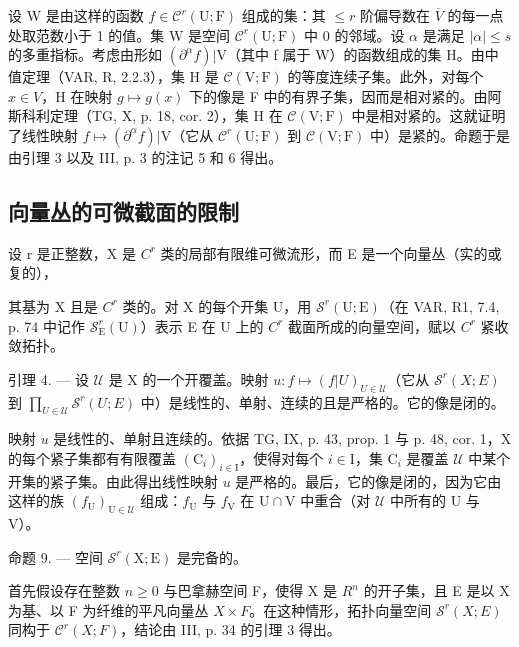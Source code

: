设 W 是由这样的函数 \(f \in \mathcal{C}^{r}(\mathrm{U};\mathrm{F})\) 组成的集：其 \(\leqslant r\) 阶偏导数在 \(\overline{V}\) 的每一点处取范数小于 1 的值。集 W 是空间 \(\mathcal{C}^{r}(\mathrm{U};\mathrm{F})\) 中 0 的邻域。设 \(\alpha\) 是满足 \(|\alpha| \leqslant s\) 的多重指标。考虑由形如 \((\partial^{\alpha}f)|\mathrm{V}\)（其中 f 属于 W）的函数组成的集 H。由中值定理（VAR, R, 2.2.3），集 H 是 \(\mathcal{C}(\mathrm{V};\mathrm{F})\) 的等度连续子集。此外，对每个 \(x \in V\)，H 在映射 \(g \mapsto g(x)\) 下的像是 F 中的有界子集，因而是相对紧的。由阿斯科利定理（TG, X, p. 18, cor. 2），集 H 在 \(\mathcal{C}(\mathrm{V};\mathrm{F})\) 中是相对紧的。这就证明了线性映射 \(f \mapsto (\partial^{\alpha}f)|\mathrm{V}\)（它从 \(\mathcal{C}^{r}(\mathrm{U};\mathrm{F})\) 到 \(\mathcal{C}(\mathrm{V};\mathrm{F})\) 中）是紧的。命题于是由引理 3 以及 III, p. 3 的注记 5 和 6 得出。

\subsection{向量丛的可微截面的限制}

设 r 是正整数，X 是 \(C^{r}\) 类的局部有限维可微流形，而 E 是一个向量丛（实的或复的），

其基为 X 且是 \(C^{r}\) 类的。对 X 的每个开集 U，用 \(\mathcal{S}^{r}(\mathrm{U};\mathrm{E})\)（在 VAR, R1, 7.4, p. 74 中记作 \(\mathcal{S}_{\mathrm{E}}^{r}(\mathrm{U})\)）表示 E 在 U 上的 \(C^{r}\) 截面所成的向量空间，赋以 \(C^{r}\) 紧收敛拓扑。

引理 4. --- 设 \(\mathcal{U}\) 是 X 的一个开覆盖。映射 \(u: f \mapsto (f|U)_{U \in \mathcal{U}}\)（它从 \(\mathcal{S}^{r}(X;E)\) 到 \(\prod_{U \in \mathcal{U}} \mathcal{S}^{r}(U;E)\) 中）是线性的、单射、连续的且是严格的。它的像是闭的。

映射 \(u\) 是线性的、单射且连续的。依据 TG, IX, p. 43, prop. 1 与 p. 48, cor. 1，X 的每个紧子集都有有限覆盖 \((\mathrm{C}_i)_{i\in \mathrm{I}}\)，使得对每个 \(i\in \mathrm{I}\)，集 \(\mathrm{C}_i\) 是覆盖 \(\mathcal{U}\) 中某个开集的紧子集。由此得出线性映射 \(u\) 是严格的。最后，它的像是闭的，因为它由这样的族 \((f_{\mathrm{U}})_{\mathrm{U}\in \mathcal{U}}\) 组成：\(f_{\mathrm{U}}\) 与 \(f_{\mathrm{V}}\) 在 \(\mathrm{U}\cap \mathrm{V}\) 中重合（对 \(\mathcal{U}\) 中所有的 U 与 V）。

命题 9. --- 空间 \(\mathcal{S}^r(\mathrm{X};\mathrm{E})\) 是完备的。

首先假设存在整数 \(n \geqslant 0\) 与巴拿赫空间 F，使得 X 是 \(R^{n}\) 的开子集，且 E 是以 X 为基、以 F 为纤维的平凡向量丛 \(X \times F\)。在这种情形，拓扑向量空间 \(\mathcal{S}^{r}(X;E)\) 同构于 \(\mathcal{C}^{r}(X;F)\)，结论由 III, p. 34 的引理 3 得出。


